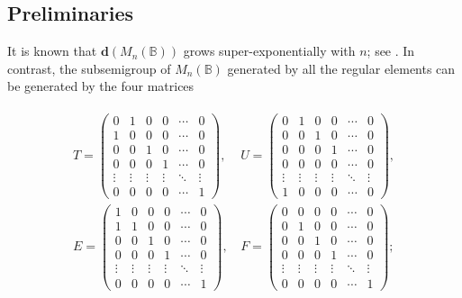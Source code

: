 \documentclass[11pt]{article}
\numberwithin{equation}{section}
\newcommand{\B}{\mathbb{B}}
\newcommand{\Bn}{M_n(\B)}
\renewcommand{\d}{\mathbf{d}}
\begin{document}
\subsection{Preliminaries}
\label{sec:BMatPrelim}

It is known that $\d(\Bn)$ grows super-exponentially with $n$; see
. In contrast, the subsemigroup of $\Bn$ generated
by all the regular elements can be generated by the four matrices

\begin{align}
  \label{eq:RegularGens}
  \begin{split}
  T = \begin{pmatrix}
    0 & 1 & 0 & 0 & \cdots & 0 \\
    1 & 0 & 0 & 0 & \cdots & 0 \\
    0 & 0 & 1 & 0 & \cdots & 0 \\
    0 & 0 & 0 & 1 & \cdots & 0 \\
    \vdots  & \vdots & \vdots & \vdots & \ddots & \vdots\\
    0 & 0 & 0 & 0 & \cdots & 1 
  \end{pmatrix}\text{, }&
  U = \begin{pmatrix}
    0 & 1 & 0 & 0 & \cdots & 0 \\
    0 & 0 & 1 & 0 & \cdots & 0 \\
    0 & 0 & 0 & 1 & \cdots & 0 \\
    0 & 0 & 0 & 0 & \cdots & 0 \\
    \vdots  & \vdots & \vdots & \vdots & \ddots & \vdots\\
    1 & 0 & 0 & 0 & \cdots & 0 
  \end{pmatrix},\\
  E = \begin{pmatrix}
    1 & 0 & 0 & 0 & \cdots & 0 \\
    1 & 1 & 0 & 0 & \cdots & 0 \\
    0 & 0 & 1 & 0 & \cdots & 0 \\
    0 & 0 & 0 & 1 & \cdots & 0 \\
    \vdots  & \vdots & \vdots & \vdots & \ddots & \vdots\\
    0 & 0 & 0 & 0 & \cdots & 1 
  \end{pmatrix}\text{, }&
  F = \begin{pmatrix}
    0 & 0 & 0 & 0 & \cdots & 0 \\
    0 & 1 & 0 & 0 & \cdots & 0 \\
    0 & 0 & 1 & 0 & \cdots & 0 \\
    0 & 0 & 0 & 1 & \cdots & 0 \\
    \vdots  & \vdots & \vdots & \vdots & \ddots & \vdots\\
    0 & 0 & 0 & 0 & \cdots & 1
  \end{pmatrix};
\end{split}
\end{align}
\end{document}
